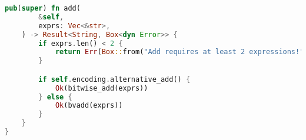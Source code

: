 \begin{lstlisting}[language=rust, caption={smt\_lib/encodings/bitwise\_adder.rs}]
	pub(super) fn add(
		&self,
		exprs: Vec<&str>,
	) -> Result<String, Box<dyn Error>> {
		if exprs.len() < 2 {
			return Err(Box::from("Add requires at least 2 expressions!"));
		}

		if self.encoding.alternative_add() {
			Ok(bitwise_add(exprs))
		} else {
			Ok(bvadd(exprs))
		}
	}
}
\end{lstlisting}
